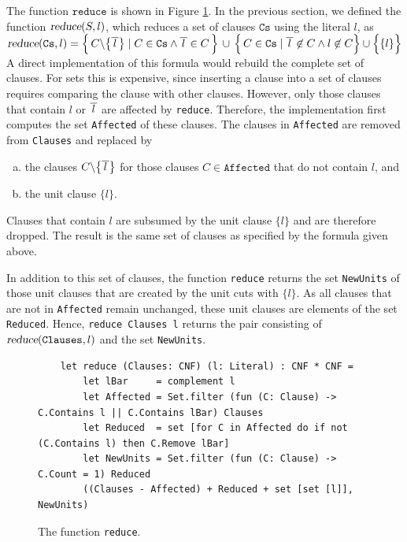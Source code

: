 The function $\texttt{reduce}$  is shown in Figure \ref{fig:reduce}.
In the previous section, we defined the function $\textsl{reduce}(S, l)$, which reduces a
set of clauses $\texttt{Cs}$ using the literal $l$, as
\\[0.2cm]
\hspace*{1.3cm}
$\textsl{reduce}(\texttt{Cs},l)  = 
 \Bigl\{\, C \backslash \bigl\{\overline{\,l\,}\bigr\} \;|\; C \in \texttt{Cs} \wedge \overline{\,l\,} \in C \,\Bigr\} 
       \,\cup\, \Bigl\{\, C \in \texttt{Cs} \mid \overline{\,l\,} \not\in C \wedge l \not\in C \Bigr\} \cup \Bigl\{\{l\}\Bigr\}
$
\\[0.2cm]
A direct implementation of this formula would rebuild the complete set of clauses.  For \Fsharp{} sets this
is expensive, since inserting a clause into a set of clauses requires comparing the clause with other clauses.
However, only those clauses that contain $l$ or $\overline{\,l\,}$ are affected by \texttt{reduce}.  Therefore, the
implementation first computes the set \texttt{Affected} of these clauses.  The clauses in \texttt{Affected} are
removed from \texttt{Clauses} and replaced by
\begin{enumerate}[(a)]
\item the clauses $C \backslash \bigl\{\overline{\,l\,}\bigr\}$ for those clauses $C \in \texttt{Affected}$
      that do not contain $l$, and
\item the unit clause $\{l\}$.
\end{enumerate}
Clauses that contain $l$ are subsumed by the unit clause $\{l\}$ and are therefore dropped.  The result is the
same set of clauses as specified by the formula given above.

In addition to this set of clauses, the function \texttt{reduce} returns the set \texttt{NewUnits} of those unit
clauses that are created by the unit cuts with $\{l\}$.  As all clauses that are not in \texttt{Affected} remain
unchanged, these unit clauses are elements of the set \texttt{Reduced}.  Hence, \texttt{reduce Clauses l} returns
the pair consisting of $\textsl{reduce}(\texttt{Clauses},l)$ and the set \texttt{NewUnits}.

\begin{figure}[!ht]
  \centering
\begin{verbatim}
    let reduce (Clauses: CNF) (l: Literal) : CNF * CNF =
        let lBar     = complement l
        let Affected = Set.filter (fun (C: Clause) -> C.Contains l || C.Contains lBar) Clauses
        let Reduced  = set [for C in Affected do if not (C.Contains l) then C.Remove lBar]
        let NewUnits = Set.filter (fun (C: Clause) -> C.Count = 1) Reduced
        ((Clauses - Affected) + Reduced + set [set [l]], NewUnits)
\end{verbatim}
\vspace*{-0.3cm}
  \caption{The function \texttt{reduce}. }
  \label{fig:reduce}
\end{figure} 


